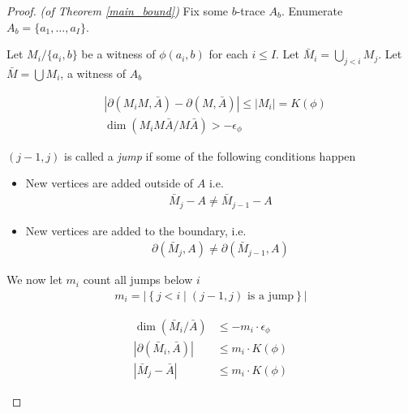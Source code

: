 \documentclass{amsart}
\newcommand{\curly}[1]{\left\{#1\right\}}
\newcommand{\abs}[1]{\left|#1\right|}
\begin{document}
\begin{proof} \textit{(of Theorem \ref{main_bound})}
	Fix some $b$-trace $A_b$. Enumerate $A_b = \{a_1, \ldots, a_I\}$.

	Let $M_i / \{a_i, b\}$ be a witness of $\phi(a_i, b)$ for each $i \leq I$.
	Let $\bar M_i = \bigcup_{j < i} M_j$.
	Let $\bar M = \bigcup M_i$, a witness of $A_b$
	
	\begin{Claim}
		\begin{align*}
			&\abs{\partial(M_i M, \bar A) - \partial(M, \bar A)} \leq |M_i| = K(\phi)\\
			&\dim(M_i M \bar A / M \bar A) > -\epsilon_\phi
		\end{align*}
	\end{Claim}
	
	\begin{Definition}
		$(j-1, j)$ is called a \emph{jump} if some of the following conditions happen
		\begin{itemize}
			\item New vertices are added outside of $A$ i.e.
				\begin{align*}
					\bar M_j - A \neq \bar M_{j-1} - A
				\end{align*}
			\item New vertices are added to the boundary, i.e.
				\begin{align*}
					\partial(\bar M_j, A) \neq \partial(\bar M_{j-1}, A)
				\end{align*}
		\end{itemize}
	\end{Definition}

	\begin{Definition}
		We now let $m_i$ count all jumps below $i$
		\begin{align*}
			m_i = \abs{\curly{j < i \mid (j-1, j) \text{ is a jump}}}
		\end{align*}
	\end{Definition}

	\begin{Lemma} \label{ub_lemma}
		\begin{align*}
			\dim(\bar M_i / \bar A) &\leq -m_i \cdot \epsilon_\phi \\
			|\partial(\bar M_i, \bar A)| &\leq m_i \cdot K(\phi) \\
			|\bar M_j - \bar A| &\leq m_i \cdot K(\phi)
		\end{align*}
	\end{Lemma}


\end{proof}
\end{document}

